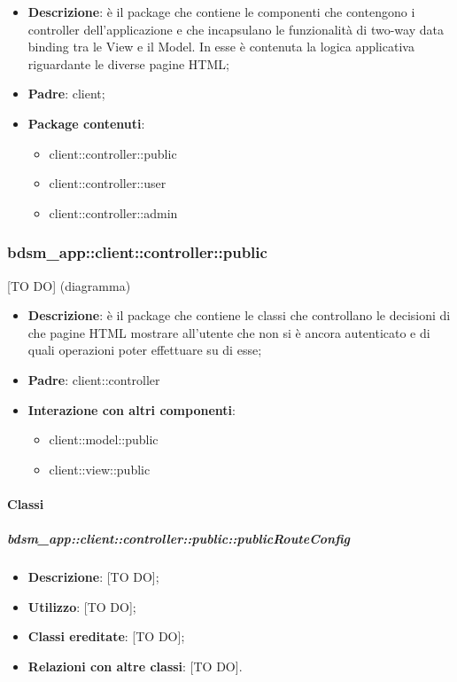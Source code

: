 \begin{itemize}
	\item \textbf{Descrizione}: è il package che contiene le componenti che contengono i controller dell'applicazione e che incapsulano le funzionalità di two-way data binding tra le View e il Model. In esse è contenuta la logica applicativa riguardante le diverse pagine HTML;
	\item \textbf{Padre}: client;
	\item \textbf{Package contenuti}:
		\begin{itemize}
			\item client::controller::public
			\item client::controller::user
			\item client::controller::admin
		\end{itemize}
\end{itemize}


\subsubsection{bdsm\_app::client::controller::public} %
\label{ssub:bdsm_app_client_controller_public}
[TO DO] (diagramma) \newline \newline

\begin{itemize}
	\item \textbf{Descrizione}: è il package che contiene le classi che controllano le decisioni di che pagine HTML mostrare all'utente che non si è ancora autenticato e di quali operazioni poter effettuare su di esse;
	\item \textbf{Padre}: client::controller
	\item \textbf{Interazione con altri componenti}:
		\begin{itemize}
			\item client::model::public
			\item client::view::public
		\end{itemize}
\end{itemize}

	\paragraph{Classi} %
		\subparagraph{bdsm\_app::client::controller::public::publicRouteConfig} %
		\label{subp:bdsm_app_client_controller_public_publicrouteconfig}
		\begin{itemize}
			\item \textbf{Descrizione}: [TO DO];
			\item \textbf{Utilizzo}: [TO DO];
			\item \textbf{Classi ereditate}: [TO DO];
			\item \textbf{Relazioni con altre classi}: [TO DO].
		\end{itemize}


